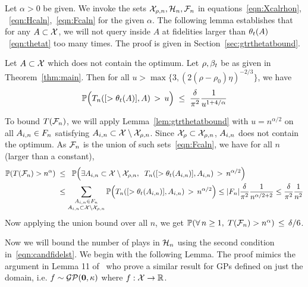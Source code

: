 Let $\alpha >0$ be given.
We invoke the sets $\mathcal{X}_{\rho,n}, \mathcal{H}_n,\mathcal{F}_n$ in equations~\eqref{eqn:Xcalrhon},
~\eqref{eqn:Hcaln},~\eqref{eqn:Fcaln}
for the given $\alpha$.
The following lemma establishes that for any $A\subset\mathcal{X}$, we will not query
inside $A$ at fidelities larger than $\theta_t(A)$~\eqref{eqn:thetat}
too many times.
The proof is given in Section~\ref{sec:gtrthetatbound}.
\begin{lemma}
\label{lem:gtrthetatbound}
Let $A\subset\mathcal{X}$ which does not contain the optimum.
Let $\rho,\beta_t$ be as given in Theorem~\ref{thm:main}.
Then for all $u>\max\{3, (2(\rho-\rho_0)\eta)^{-2/3}\}$, we have
\[
\mathbb{P}\Big(T_{n}([>\theta_t(A)],A) \,>\, u \Big)
\;\leq\; \frac{\delta}{\pi^2}\frac{1}{u^{1+4/\alpha}}
\]
\end{lemma}
To bound $T(\mathcal{F}_n)$, we will apply Lemma~\ref{lem:gtrthetatbound} with $u=n^{\alpha/2}$
on all $A_{i,n}\in F_n$ satisfying
$A_{i,n}\subset\mathcal{X}\setminus\mathcal{X}_{\rho,n}$.
Since $\mathcal{X}_\rho\subset\mathcal{X}_{\rho,n}$, $A_{i,n}$ does not contain the optimum.
As $\mathcal{F}_n$ is the union of such sets~\eqref{eqn:Fcaln}, we have for all
$n$ (larger than a constant),
\begin{align*}
\mathbb{P}(T(\mathcal{F}_n) > n^{\alpha}) \;&\leq\;\;
\mathbb{P}\Big( \exists A_{i,n}\subset\mathcal{X}\setminus\mathcal{X}_{\rho,n}, \;\;
T_{n}([>\theta_t(A_{i,n})],A_{i,n}) \,>\,  n^{\alpha/2} \Big) \\
  &\leq
  \sum_{\substack{A_{i,n}\in F_n\\ A_{i,n}\subset\mathcal{X}\setminus\mathcal{X}_{\rho,n}}} \mathbb{P}\Big(
    T_{n}([>\theta_t(A_{i,n})],A_{i,n}) \,>\, n^{\alpha/2} \Big) 
  \leq |F_n|\frac{\delta}{\pi^2} \frac{1}{n^{\alpha/2 + 2}} 
    \leq \frac{\delta}{\pi^2}\frac{1}{n^2}
\end{align*}
Now applying the union bound over all $n$, we get
$\mathbb{P}(\forall\,n\geq 1,\;T(\mathcal{F}_n) > n^{\alpha}) \,\leq\, \delta/6$.

Now we will bound the number of plays in $\mathcal{H}_n$ using the second condition
in~\eqref{eqn:candfidelst}.
We begin with the following Lemma.
The proof mimics the argument in Lemma 11 of~\citet{kandasamy16mfbo} who prove
 a similar result for GPs defined on just the domain, i.e. $f\sim\mathcal{G}\mathcal{P}({\bf 0},\kappa)$
where $f:\mathcal{X}\rightarrow\mathbb{R}$.

